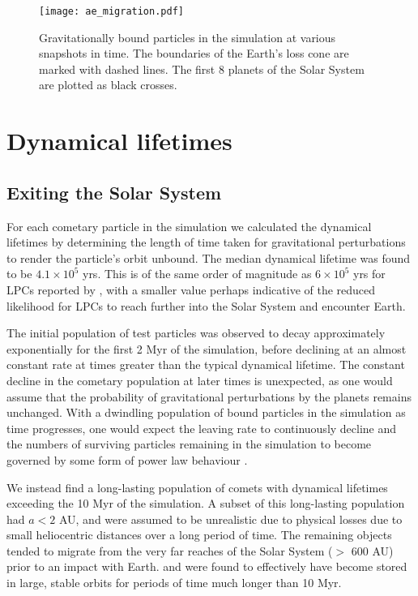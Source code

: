 
\begin{figure}[t!]
    \centering
    \texttt{[image: ae\_migration.pdf]}
    \caption[Particle Migration]{Gravitationally bound particles in the simulation at various snapshots in time. The boundaries of the Earth's loss cone are marked with dashed lines. The first 8 planets of the Solar System are plotted as black crosses.}
    \label{fig:migration}
\end{figure}

\section{Dynamical lifetimes}

\subsection{Exiting the Solar System}

For each cometary particle in the simulation we calculated the dynamical lifetimes by determining the length of time taken for gravitational perturbations to render the particle's orbit unbound. The median dynamical lifetime was found to be $4.1\times10^5$ yrs. This is of the same order of magnitude as $6\times10^5$ yrs for LPCs reported by \cite{1979IAUS...81..277W}, with a smaller value perhaps indicative of the reduced likelihood for LPCs to reach further into the Solar System and encounter Earth.

The initial population of test particles was observed to decay approximately exponentially for the first 2 Myr of the simulation, before declining at an almost constant rate at times greater than the typical dynamical lifetime. The constant decline in the cometary population at later times is unexpected, as one would assume that the probability of gravitational perturbations by the planets remains unchanged. With a dwindling population of bound particles in the simulation as time progresses, one would expect the leaving rate to continuously decline and the numbers of surviving particles remaining in the simulation to become governed by some form of power law behaviour \citep{1996ASPC..107..233D}. 

We instead find a long-lasting population of comets with dynamical lifetimes exceeding the 10 Myr of the simulation. A subset of this long-lasting population had $a < 2$ AU, and were assumed to be unrealistic due to physical losses due to small heliocentric distances over a long period of time. The remaining objects tended to migrate from the very far reaches of the Solar System ($>$ 600 AU) prior to an impact with Earth. and were found to effectively have become stored in large, stable orbits for periods of time much longer than 10 Myr. 

